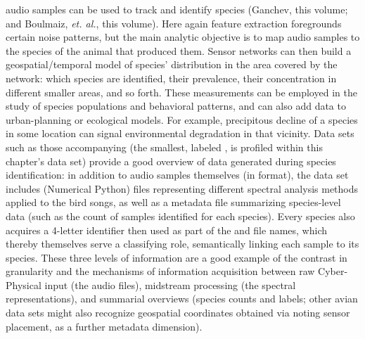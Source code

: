{\begin{description}
audio samples can be used to track and identify 
species (Ganchev, this volume; and Boulmaiz, \textit{et. al.},
this volume).  Here again feature 
extraction foregrounds certain noise patterns, but the 
main analytic objective is to map audio samples to 
the species of the animal that produced them.  
Sensor networks can then build a geospatial/temporal 
model of species' distribution in the area covered by 
the network: which species are identified, their prevalence, 
their concentration in different smaller areas, and so forth.  
These measurements can be employed in the study of 
species populations and behavioral patterns, and can 
also add data to urban-planning or ecological models.  
For example, precipitous decline of a species in some 
location can signal environmental degradation in that vicinity.   
\pseudoIndent{}
Data sets such as those accompanying \cite{JustinSalamon} 
(the smallest, labeled \CLOds{}, is profiled within
this chapter's data set)   
provide a good overview of data generated during 
species identification: in addition to audio 
samples themselves (in \WAV{} format), the data set 
includes \NPY{} (Numerical Python) files representing 
different spectral analysis methods applied 
to the bird songs, as well as a metadata file 
summarizing species-level data (such as the count 
of samples identified for each species).  
Every species also acquires a 4-letter identifier then used
as part of the \WAV{} and \NPY{} file names, which thereby 
themselves serve a classifying role, 
semantically linking each sample to its species.  
These three levels of information are a good 
example of the contrast in granularity 
\mdash{} and the mechanisms of information acquisition 
\mdash{} between raw Cyber-Physical input (the audio files), midstream 
processing (the spectral representations), and 
summarial overviews (species counts and labels;   
other avian data sets might also recognize 
geospatial coordinates obtained via noting sensor placement, 
as a further metadata dimension).
 

\end{description}}
